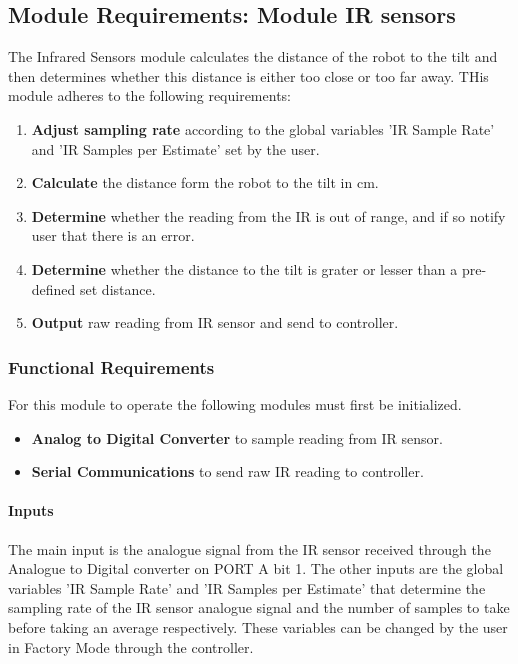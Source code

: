 \documentclass{article}
\begin{document}
\subsection{Module Requirements: Module IR sensors}
The Infrared Sensors module calculates the distance of the robot to the tilt and then determines whether this distance is either too close or too far away. THis module adheres to the following requirements:
\begin{enumerate}
	\item \textbf{Adjust sampling rate} according to the global variables 'IR Sample Rate' and 'IR Samples per Estimate' set by the user.
	\item \textbf{Calculate} the distance form the robot to the tilt in cm. 
	\item \textbf{Determine} whether the reading from the IR is out of range, and if so notify user that there is an error.	
	\item \textbf{Determine} whether the distance to the tilt is grater or lesser than a pre-defined set distance.
	\item \textbf{Output} raw reading from IR sensor and send to controller.
\end{enumerate} 

\subsubsection{Functional Requirements}
For this module to operate the following modules must first be initialized.
\begin{itemize}
	\item \textbf{Analog to Digital Converter} to sample reading from IR sensor.
	\item \textbf{Serial Communications} to send raw IR reading to controller.
\end{itemize}

\paragraph{Inputs}

The main input is the analogue signal from the IR sensor received through the Analogue to Digital converter on PORT A bit 1. 
The other inputs are the global variables 'IR Sample Rate' and 'IR Samples per Estimate' that determine the sampling rate of the IR sensor analogue signal and the number of samples to take before taking an average respectively. These variables can be changed by the user in Factory Mode through the controller.  
\end{document}
